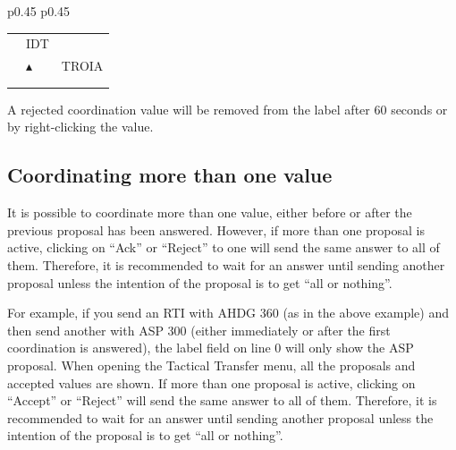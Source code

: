\documentclass[a4paper,oneside,11pt]{memoir}
\begin{document}
\begin{longtable}{p{} p{}}
  \begin{tabular}{
    >{\columncolor{Flight Highlight}}l 
    >{\columncolor{Flight Highlight}}l
    >{\columncolor{Flight Highlight}}l }
    {\color{Coordination} ABC123} & {\color{Coordination} IDT}       & {\color{Coordination} }      \\
    {\color{Coordination} 100}    & {\color{Coordination} $\blacktriangle$} & {\color{Coordination} TROIA} \\
    {\color{Coordination} 180}    & {\color{Coordination} }          & {\color{Coordination} }  \\     
    {\color{Warning} H360} & {\color{Coordination} }       & {\color{Coordination} }      \\
  \end{tabular}
\end{longtable}

\bigskip

A rejected coordination value will be removed from the label after 60 seconds or by right-clicking the value.


\subsection{Coordinating more than one value}

It is possible to coordinate more than one value, either before or after the previous proposal has been answered. However, if more than one proposal is active, clicking on “Ack” or “Reject” to one will send the same answer to all of them. Therefore, it is recommended to wait for an answer until sending another proposal unless the intention of the proposal is to get “all or nothing”.

\bigskip

For example, if you send an RTI with AHDG 360 (as in the above example) and then send another with ASP 300 (either immediately or after the first coordination is answered), the label field on line 0 will only show the ASP proposal. When opening the Tactical Transfer menu, all the proposals and accepted values are shown. If more than one proposal is active, clicking on “Accept” or “Reject” will send the same answer to all of them. Therefore, it is recommended to wait for an answer until sending another proposal unless the intention of the proposal is to get “all or nothing”.
\end{document}
